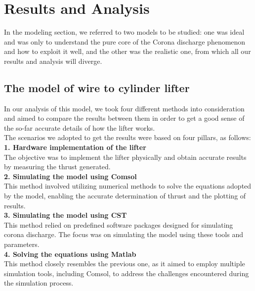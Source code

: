 \section*{Results and Analysis}
\hspace{\parindent}In the modeling section, we referred to two models to be studied: one was ideal and was only to understand the pure core of the Corona discharge phenomenon and how to exploit it well, and the other was the realistic one, from which all our results and analysis will diverge.
\subsection*{The model of wire to cylinder lifter }
\hspace{\parindent}In our analysis of this model, we took four different methods into consideration and aimed to compare the results between them in order to get a good sense of the so-far accurate details of how the lifter works.\\
The scenarios we adopted to get the results were based on four pillars, as follows:\\
\textbf{1.	Hardware implementation of the lifter}\\
The objective was to implement the lifter physically and obtain accurate results by measuring the thrust generated.\\
\textbf{2. Simulating the model using Comsol	 }\\
This method involved utilizing numerical methods to solve the equations adopted by the model, enabling the accurate determination of thrust and the plotting of results.\\
 \textbf{3.	Simulating the model using CST}\\
 This method relied on predefined software packages designed for simulating corona discharge. The focus was on simulating the model using these tools and parameters.\\
 \textbf{4.	Solving the equations using Matlab}\\
 This method closely resembles the previous one, as it aimed to employ multiple simulation tools, including Comsol, to address the challenges encountered during the simulation process.\\
 
